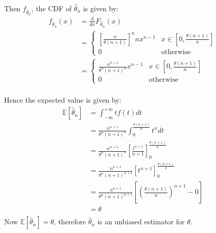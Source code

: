 \documentclass{article}
\newcommand{\E}{\mathbb{E}}
\newcommand{\thetahat}{\hat\theta}
\begin{document}
Then \(f_{\thetahat_n}\), the CDF of \(\thetahat_n\) is given by:
\begin{align*}
    f_{\thetahat_n}(x)
     & = \frac{d}{dx} F_{\thetahat_n}(x) \\
     & =
    \begin{cases}
        \left[\frac{n}{\theta (n+1)}\right]^n n x^{n-1} & x \in [0, \frac{\theta (n+1)}{n}] \\
        0                                               & \text{otherwise}
    \end{cases}            \\
     & =
    \begin{cases}
        \frac{n^{n+1}}{\theta^n (n+1)^n} x^{n-1} & x \in [0, \frac{\theta (n+1)}{n}] \\
        0                                        & \text{otherwise}
    \end{cases}            \\
\end{align*}

Hence the expected value is given by:
\begin{align*}
    \E[\hat\theta_n]
     & = \int_{-\infty}^{+\infty} t f(t) dt                                                                 \\
     & = \frac{n^{n+1}}{\theta^n (n+1)^n} \int_{0}^{\frac{\theta (n+1)}{n}} t^n dt                          \\
     & = \frac{n^{n+1}}{\theta^n (n+1)^n} \left[\frac{t^{n+1}}{n+1}\right]_{0}^{\frac{\theta (n+1)}{n}}     \\
     & = \frac{n^{n+1}}{\theta^n (n+1)^{n+1}} \left[t^{n+1}\right]_{0}^{\frac{\theta (n+1)}{n}}             \\
     & = \frac{n^{n+1}}{\theta^n (n+1)^{n+1}} \left[ \left( \frac{\theta (n+1)}{n}\right)^{n+1} - 0 \right] \\
     & = \theta                                                                                             \\
\end{align*}
Now \(\E[\hat\theta_n] = \theta\), therefore \(\thetahat_n\) is an unbiased estimator for \(\theta\).
\end{document}
